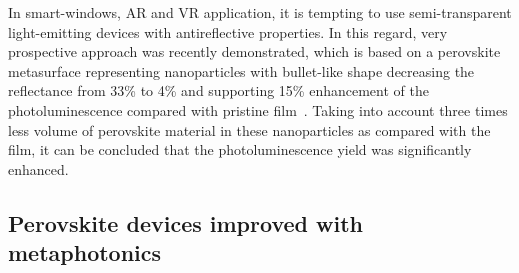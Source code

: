 \documentclass[journal=chreay,manuscript=review]{achemso}
\begin{document}

In smart-windows, AR and VR application, it is tempting to use semi-transparent light-emitting devices with antireflective properties. In this regard, very prospective approach was recently demonstrated, which is based on a perovskite metasurface representing nanoparticles with bullet-like shape decreasing the reflectance from 33\% to 4\% and supporting 15\% enhancement of the photoluminescence compared with pristine film~\citep{baryshnikova2020broadband}. Taking into account three times less volume of perovskite material in these nanoparticles as compared with the film, it can be concluded that the photoluminescence yield was significantly enhanced.


\subsection{Perovskite devices improved with metaphotonics}
\end{document}
